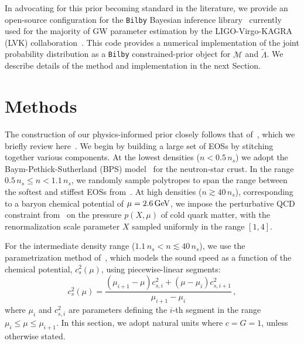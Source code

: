 \documentclass[twocolumn]{aastex631}
\begin{document}
In advocating for this prior becoming standard in the literature, we
provide an open-source configuration for the \texttt{Bilby} Bayesian
inference library~\citep{ashton19,romeroshaw20} currently used for the
majority of GW parameter estimation by the LIGO-Virgo-KAGRA (LVK)
collaboration~\citep[e.g.,][]{LIGO, Virgo, KAGRA}. This code provides a
numerical implementation of the joint probability distribution as a
\texttt{Bilby} constrained-prior object for $\mathcal{M}$ and
$\tilde{\Lambda}$. We describe details of the method and implementation
in the next Section.


\section{Methods}
\label{sec:Methods}
	
The construction of our physics-informed prior closely follows that
of~\citet{Altiparmak:2022}, which we briefly review here~\citep[see][for
  additional details]{Ecker:2022, Ecker:2022dlg}. We begin by building a
large set of EOSs by stitching together various components. At the
lowest densities ($n<0.5\,n_s$) we adopt the Baym-Pethick-Sutherland
(BPS) model~\citep{Baym71} for the neutron-star crust. In the range
$0.5\,n_s\le n < 1.1\,n_s$, we randomly sample polytropes to span the
range between the softest and stiffest EOSs
from~\citet{Hebeler:2013nza}. At high densities ($n \gtrsim 40\,n_s$),
corresponding to a baryon chemical potential of $\mu = 2.6\,\rm GeV$, we
impose the perturbative QCD constraint from~\citet{Fraga2014} on the
pressure $p(X, \mu)$ of cold quark matter, with the renormalization scale
parameter $X$ sampled uniformly in the range $[1,4]$.
	
For the intermediate density range ($1.1\,n_s < n \lesssim 40\,n_s$), we
use the parametrization method of~\citet{Annala2019}, which models the
sound speed as a function of the chemical potential, $c_s^2(\mu)$, using
piecewise-linear segments:
%
\begin{equation} \label{eq:cs2}
 c_s^2(\mu) = \frac{\left(\mu_{i+1}-\mu \right) c_{s,i}^2 + \left(\mu -
   \mu_i \right) c_{s,i+1}^2}{\mu_{i+1}-\mu_i}\,,
\end{equation}
%
where $\mu_i$ and $c_{s,i}^2$ are parameters defining the $i$-th segment
in the range $\mu_i \leq \mu \leq \mu_{i+1}$. In this section, we
adopt natural units where $c=G=1$, unless otherwise stated.
\end{document}
